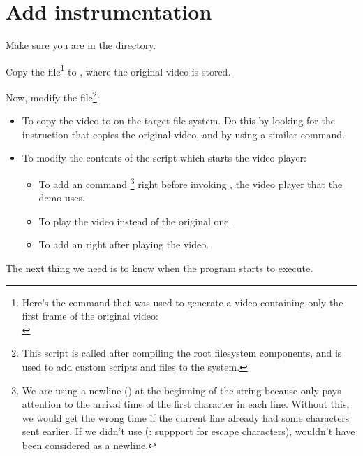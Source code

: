 \section{Add instrumentation}

Make sure you are in the  directory.

Copy the  file\footnote {Here's the command that
was used to generate a video containing only the first frame of the original video: \\
}
to , where the original video is
stored.

Now, modify the 
file\footnote{This script is called after compiling the root filesystem
components, and is used to add custom scripts and files to the system.}:  
\begin{itemize}
\item To copy the  video to  on the target
      file system. Do this by looking for the instruction that copies the
      original video, and by using a similar command.
\item To modify the contents of the  script
      which starts the video player:
      \begin{itemize}
      \item To add an  command
	    \footnote{We are using a newline (\code{\n}) at the
beginning of the string because  only pays attention to
the arrival time of the first character in each line. Without this, we
would get the wrong time if the current line already had some
characters sent earlier. If we didn't use  (:
suppport for escape characters), \code{\n} wouldn't have been considered
as a newline.}
            right before invoking , the video player that the demo
	    uses.
      \item To play the  video instead of the original
  	    one.
      \item To add an  right after
 	    playing the video.
      \end{itemize}
\end{itemize}

The next thing we need is to know when the  program starts to
execute.

